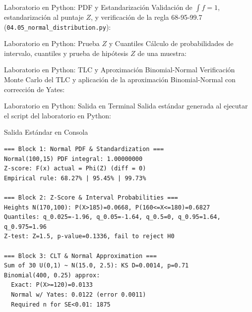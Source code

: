\documentclass[10pt, aspectratio=169]{beamer}
\begin{document}
\begin{frame}[fragile]{Laboratorio en Python: PDF y Estandarización}
  \scriptsize
  Validación de $\int f = 1$, estandarización al puntaje $Z$, y verificación de la regla 68-95-99.7 (\texttt{04.05\_normal\_distribution.py}):
  \vspace{0.02cm}
  {
  }
\end{frame}

\begin{frame}[fragile]{Laboratorio en Python: Prueba $Z$ y Cuantiles}
  \scriptsize
  Cálculo de probabilidades de intervalo, cuantiles y prueba de hipótesis $Z$ de una muestra:
  \vspace{0.02cm}
  {
  }
\end{frame}

\begin{frame}[fragile]{Laboratorio en Python: TLC y Aproximación Binomial-Normal}
  \scriptsize
  Verificación Monte Carlo del TLC y aplicación de la aproximación Binomial-Normal con corrección de Yates:
  \vspace{0.0cm}
  {
  }
\end{frame}

\begin{frame}[fragile]{Laboratorio en Python: Salida en Terminal}
  \scriptsize
  Salida estándar generada al ejecutar el script del laboratorio en Python:
  \vspace{0.02cm}
  \begin{block}{Salida Estándar en Consola}
    \fontsize{4pt}{5pt}\selectfont
    \begin{verbatim}
=== Block 1: Normal PDF & Standardization ===
Normal(100,15) PDF integral: 1.00000000
Z-score: F(x) actual = Phi(Z) (diff = 0)
Empirical rule: 68.27% | 95.45% | 99.73%

=== Block 2: Z-Score & Interval Probabilities ===
Heights N(170,100): P(X>185)=0.0668, P(160<=X<=180)=0.6827
Quantiles: q_0.025=-1.96, q_0.05=-1.64, q_0.5=0, q_0.95=1.64, q_0.975=1.96
Z-test: Z=1.5, p-value=0.1336, fail to reject H0

=== Block 3: CLT & Normal Approximation ===
Sum of 30 U(0,1) ~ N(15.0, 2.5): KS D=0.0014, p=0.71
Binomial(400, 0.25) approx:
  Exact: P(X>=120)=0.0133
  Normal w/ Yates: 0.0122 (error 0.0011)
  Required n for SE<0.01: 1875
    \end{verbatim}
  \end{block}
\end{frame}
\end{document}
